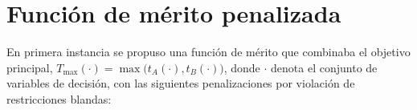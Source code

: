 \section*{Función de mérito penalizada}
En primera instancia se propuso una función de mérito que combinaba el objetivo principal, 
$T_{\max}(\cdot)=\max\big(t_A(\cdot),t_B(\cdot)\big)$, donde \(\cdot\) 
denota el conjunto de variables de decisión, con las siguientes penalizaciones
por violación de restricciones blandas:

